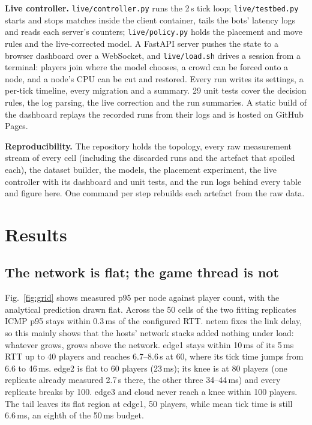\documentclass[conference]{IEEEtran}
\begin{document}
\textbf{Live controller.} \texttt{live/controller.py} runs the 2\,s tick
loop; \texttt{live/testbed.py} starts and stops matches inside the client
container, tails the bots' latency logs and reads each server's counters;
\texttt{live/policy.py} holds the placement and move rules and the
live-corrected model. A FastAPI server pushes the state to a browser
dashboard over a WebSocket, and \texttt{live/load.sh} drives a session from
a terminal: players join where the model chooses, a crowd can be forced onto
a node, and a node's CPU can be cut and restored. Every run writes its
settings, a per-tick timeline, every migration and a summary. 29 unit tests
cover the decision rules, the log parsing, the live correction and the
run summaries. A static
build of the dashboard replays the recorded runs from their logs and is
hosted on GitHub Pages.

\textbf{Reproducibility.} The repository holds the topology, every raw
measurement stream of every cell (including the discarded runs and the
artefact that spoiled each), the dataset builder, the models, the placement
experiment, the live controller with its dashboard and unit tests, and the
run logs behind every table and figure here. One command per step rebuilds
each artefact from the raw data.


\section{Results}

\subsection{The network is flat; the game thread is not}
Fig.~\ref{fig:grid} shows measured p95 per node against player count, with
the analytical prediction drawn flat. Across the 50 cells of the two fitting
replicates ICMP p95 stays within 0.3\,ms of the configured RTT. netem fixes
the link delay, so this mainly shows that the hosts' network stacks added
nothing under load: whatever grows, grows above the network. edge1 stays within 10\,ms of its 5\,ms
RTT up to 40 players and reaches 6.7--8.6\,s at 60, where its tick time jumps
from 6.6 to 46\,ms. edge2 is flat to 60 players (23\,ms); its knee is at 80
players (one replicate already measured 2.7\,s there, the other three
34--44\,ms) and every replicate breaks by 100. edge3 and cloud never reach a knee within 100 players. The tail
leaves its flat region at edge1, 50 players, while mean tick time is still
6.6\,ms, an eighth of the 50\,ms budget.
\end{document}
